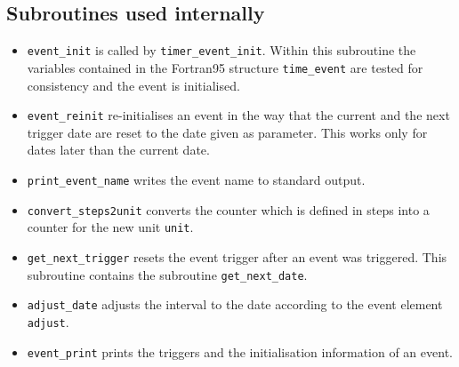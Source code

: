 \documentclass[twoside]{article}
\begin{document}
\subsection{Subroutines used internally} 
%
\begin{itemize}
\item \verb|event_init| is called by \verb|timer_event_init|. Within this
      subroutine the variables contained in the Fortran95 structure
      \verb|time_event| are tested for consistency and the event is
      initialised.
\item \verb|event_reinit| re-initialises an event in the way that the current
      and the next trigger date are reset to the date given as parameter.
      This works only for dates later than the current date.
\item \verb|print_event_name| writes the event name to standard output.
\item \verb|convert_steps2unit| converts the counter which is defined in steps
      into a counter for the new unit \verb|unit|.
\item \verb|get_next_trigger| resets the event trigger after an
      event was triggered. This subroutine contains the subroutine 
      \verb|get_next_date|. 
\item \verb|adjust_date| adjusts the interval to the date  according to the
      event element \verb|adjust|.
\item \verb|event_print| prints the triggers and the initialisation information
      of an event.
\end{itemize}

\end{document}
